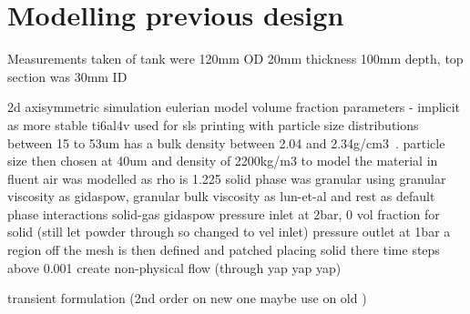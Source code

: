 \section{Modelling previous design}
Measurements taken of tank were 120mm OD 20mm thickness 100mm depth, top section was 30mm ID

2d axisymmetric simulation
eulerian model
volume fraction parameters - implicit as more stable
ti6al4v used for sls printing with particle size distributions between 15 to 53um has a bulk density between 2.04 and 2.34g/cm3~\cite{ma17040952}.
particle size then chosen at 40um and density of 2200kg/m3 to model the material in fluent
air was modelled as rho is 1.225
solid phase was granular using granular viscosity as gidaspow, granular bulk viscosity as lun-et-al and rest as default
phase interactions solid-gas gidaspow
pressure inlet at 2bar, 0 vol fraction for solid (still let powder through so changed to vel inlet)
pressure outlet at 1bar
a region off the mesh is then defined and patched placing solid there
time steps above 0.001 create non-physical flow (through yap yap yap)
 
transient formulation (2nd order on new one maybe use on old  )
\newpage
